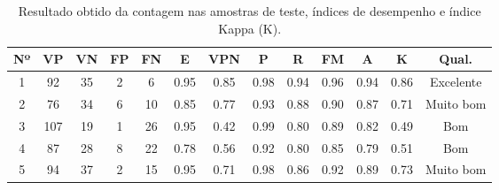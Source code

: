 \begin{table}[ht]
  \caption{Resultado obtido da contagem nas amostras de teste, índices de desempenho e índice Kappa (K).}
  \label{tab:matrix_result}
  \begin{center}
    \begin{tabular}{c|cccc|cccccc|cc}
    \toprule
    \textbf{Nº} & \textbf{VP} & \textbf{VN} & \textbf{FP} & \textbf{FN} & \textbf{E} & \textbf{VPN} & \textbf{P} & \textbf{R} & \textbf{FM} & \textbf{A} & \textbf{K} & \textbf{Qual.} \\
    \midrule
      1 & 92 & 35 & 2 & 6 & 0.95 & 0.85 & 0.98 & 0.94 & 0.96 & 0.94 & 0.86 & Excelente\\
      2 & 76 & 34 & 6 & 10 & 0.85 & 0.77 & 0.93 & 0.88 & 0.90 & 0.87 & 0.71 & Muito bom\\
      3 & 107 & 19 & 1 & 26 & 0.95 & 0.42 & 0.99 & 0.80 & 0.89 & 0.82 & 0.49 & Bom \\
      4 & 87 & 28 & 8 & 22 & 0.78 & 0.56 & 0.92 & 0.80 & 0.85 & 0.79 & 0.51 & Bom \\
      5 & 94 & 37 & 2 & 15 & 0.95 & 0.71 & 0.98 & 0.86 & 0.92 & 0.89 & 0.73 & Muito bom\\
    \bottomrule
    \end{tabular}
  \end{center}
\end{table}

